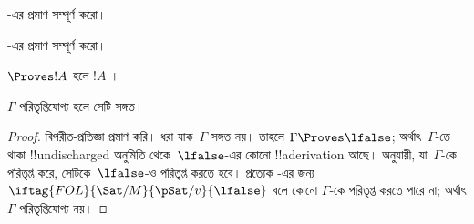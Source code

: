 \documentclass[../../../include/open-logic-section]{subfiles}
\begin{document}
\begin{prob}
-এর প্রমাণ সম্পূর্ণ করো।
\end{prob}
\tagendprob

\begin{prob}
-এর প্রমাণ সম্পূর্ণ করো।
\end{prob}
\tagendprob

\begin{cor}
$\Proves !A$ হলে $!A$ ।
\end{cor}

\begin{cor}
$\Gamma$ পরিতৃপ্তিযোগ্য হলে সেটি সঙ্গত।
\end{cor}

\begin{proof}
বিপরীত-প্রতিজ্ঞা প্রমাণ করি। ধরা যাক~$\Gamma$ সঙ্গত নয়। তাহলে
$\Gamma \Proves \lfalse$; অর্থাৎ~$\Gamma$-তে থাকা !!{undischarged}
অনুমিতি থেকে~$\lfalse$-এর কোনো !!a{derivation} আছে।
 অনুযায়ী,
যা~$\Gamma$-কে পরিতৃপ্ত করে, সেটিকে~$\lfalse$-ও পরিতৃপ্ত করতে হবে।
প্রত্যেক -এর
জন্য $\iftag{FOL}{\Sat/{M}}{\pSat/{v}}{\lfalse}$ বলে কোনো
 $\Gamma$-কে পরিতৃপ্ত করতে
পারে না; অর্থাৎ $\Gamma$ পরিতৃপ্তিযোগ্য নয়।
\end{proof}
\end{document}
